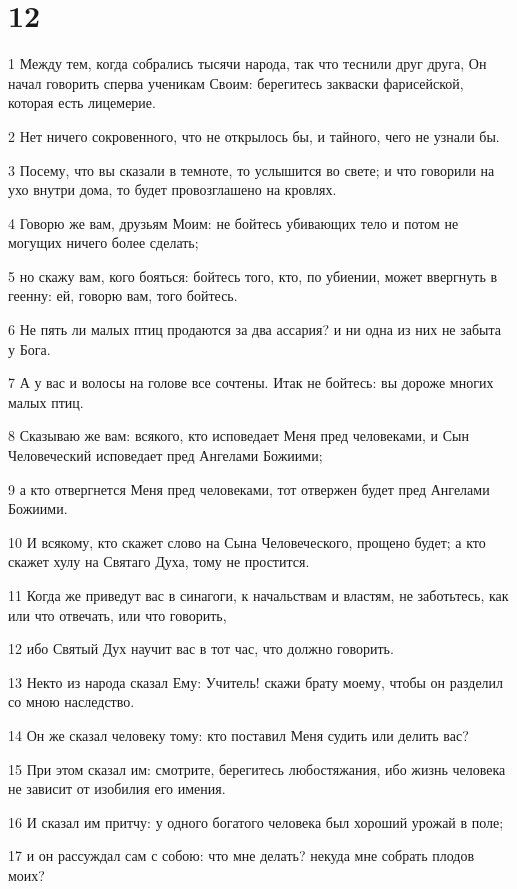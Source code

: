 \chapter{12}

\par 1 Между тем, когда собрались тысячи народа, так что теснили друг друга, Он начал говорить сперва ученикам Своим: берегитесь закваски фарисейской, которая есть лицемерие.
\par 2 Нет ничего сокровенного, что не открылось бы, и тайного, чего не узнали бы.
\par 3 Посему, что вы сказали в темноте, то услышится во свете; и что говорили на ухо внутри дома, то будет провозглашено на кровлях.
\par 4 Говорю же вам, друзьям Моим: не бойтесь убивающих тело и потом не могущих ничего более сделать;
\par 5 но скажу вам, кого бояться: бойтесь того, кто, по убиении, может ввергнуть в геенну: ей, говорю вам, того бойтесь.
\par 6 Не пять ли малых птиц продаются за два ассария? и ни одна из них не забыта у Бога.
\par 7 А у вас и волосы на голове все сочтены. Итак не бойтесь: вы дороже многих малых птиц.
\par 8 Сказываю же вам: всякого, кто исповедает Меня пред человеками, и Сын Человеческий исповедает пред Ангелами Божиими;
\par 9 а кто отвергнется Меня пред человеками, тот отвержен будет пред Ангелами Божиими.
\par 10 И всякому, кто скажет слово на Сына Человеческого, прощено будет; а кто скажет хулу на Святаго Духа, тому не простится.
\par 11 Когда же приведут вас в синагоги, к начальствам и властям, не заботьтесь, как или что отвечать, или что говорить,
\par 12 ибо Святый Дух научит вас в тот час, что должно говорить.
\par 13 Некто из народа сказал Ему: Учитель! скажи брату моему, чтобы он разделил со мною наследство.
\par 14 Он же сказал человеку тому: кто поставил Меня судить или делить вас?
\par 15 При этом сказал им: смотрите, берегитесь любостяжания, ибо жизнь человека не зависит от изобилия его имения.
\par 16 И сказал им притчу: у одного богатого человека был хороший урожай в поле;
\par 17 и он рассуждал сам с собою: что мне делать? некуда мне собрать плодов моих?
